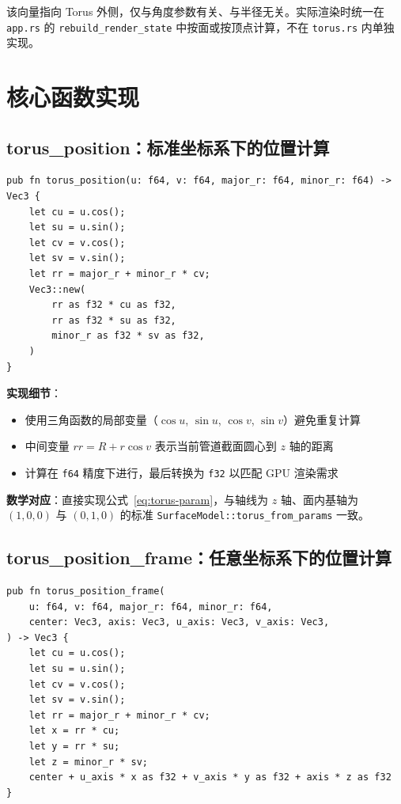 \documentclass[12pt,a4paper]{article}
\begin{document}
该向量指向 Torus 外侧，仅与角度参数有关、与半径无关。实际渲染时统一在 \texttt{app.rs} 的 \texttt{rebuild\_render\_state} 中按面或按顶点计算，不在 \texttt{torus.rs} 内单独实现。

\section{核心函数实现}

\subsection{torus\_position：标准坐标系下的位置计算}

\begin{lstlisting}[]
pub fn torus_position(u: f64, v: f64, major_r: f64, minor_r: f64) -> Vec3 {
    let cu = u.cos();
    let su = u.sin();
    let cv = v.cos();
    let sv = v.sin();
    let rr = major_r + minor_r * cv;
    Vec3::new(
        rr as f32 * cu as f32,
        rr as f32 * su as f32,
        minor_r as f32 * sv as f32,
    )
}
\end{lstlisting}

\textbf{实现细节}：
\begin{itemize}
\item 使用三角函数的局部变量（$\cos u$, $\sin u$, $\cos v$, $\sin v$）避免重复计算
\item 中间变量 $rr = R + r\cos v$ 表示当前管道截面圆心到 $z$ 轴的距离
\item 计算在 \texttt{f64} 精度下进行，最后转换为 \texttt{f32} 以匹配 GPU 渲染需求
\end{itemize}

\textbf{数学对应}：直接实现公式~\eqref{eq:torus-param}，与轴线为 $z$ 轴、面内基轴为 $(1,0,0)$ 与 $(0,1,0)$ 的标准 \texttt{SurfaceModel::torus\_from\_params} 一致。

\subsection{torus\_position\_frame：任意坐标系下的位置计算}

\begin{lstlisting}[]
pub fn torus_position_frame(
    u: f64, v: f64, major_r: f64, minor_r: f64,
    center: Vec3, axis: Vec3, u_axis: Vec3, v_axis: Vec3,
) -> Vec3 {
    let cu = u.cos();
    let su = u.sin();
    let cv = v.cos();
    let sv = v.sin();
    let rr = major_r + minor_r * cv;
    let x = rr * cu;
    let y = rr * su;
    let z = minor_r * sv;
    center + u_axis * x as f32 + v_axis * y as f32 + axis * z as f32
}
\end{lstlisting}
\end{document}
